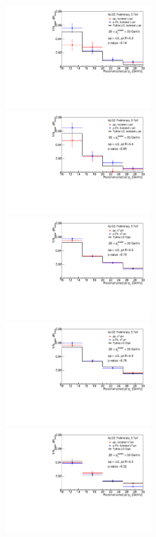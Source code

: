 \begin{figure}[h]
\centering
\includegraphics[width=0.495\textwidth]{GammaJet/FinalResult_jetptR0_3}
\includegraphics[width=0.495\textwidth]{GammaJet/FinalResult_jetptR0_4}\\
\includegraphics[width=0.495\textwidth]{GammaJet/FinalResult_Pionjetpt_R0_3}
\includegraphics[width=0.495\textwidth]{GammaJet/FinalResult_Pionjetpt_R0_4}\\
\includegraphics[width=0.495\textwidth]{GammaJet/FinalResult_IsoPionjetpt_R0_3}

\end{figure}
